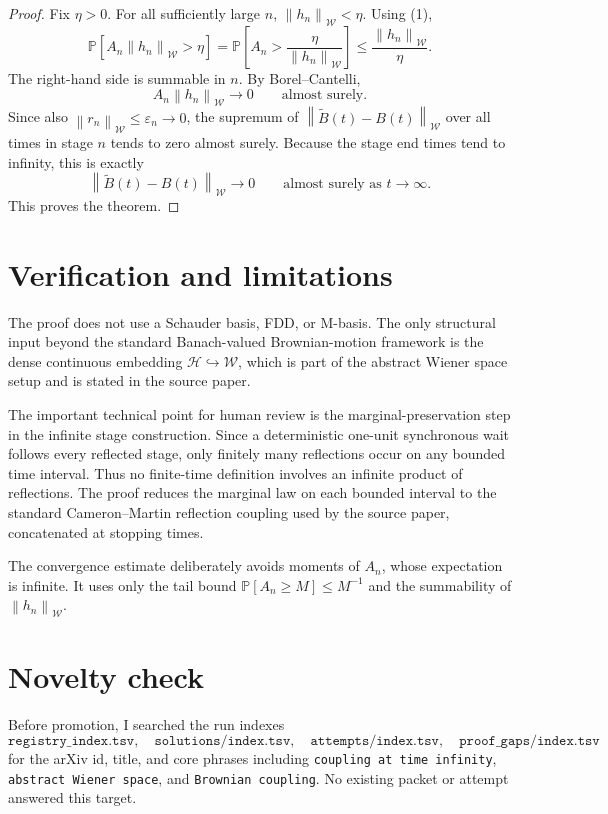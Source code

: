 \documentclass[11pt]{article}
\newcommand{\W}{\mathcal W}
\newcommand{\HH}{\mathcal H}
\newcommand{\norm}[1]{\left\lVert #1 \right\rVert}
\newcommand{\Prob}{\mathbb P}
\begin{document}
\begin{proof}
Fix \(\eta>0\).  For all sufficiently large \(n\), \(\norm{h_n}_{\W}<\eta\).
Using (1),
\[
        \Prob\!\left[
        A_n\norm{h_n}_{\W}>\eta
        \right]
        =
        \Prob\!\left[
        A_n>\frac{\eta}{\norm{h_n}_{\W}}
        \right]
        \le
        \frac{\norm{h_n}_{\W}}{\eta}.
\]
The right-hand side is summable in \(n\).  By Borel--Cantelli,
\[
        A_n\norm{h_n}_{\W}\longrightarrow0
        \qquad\text{almost surely.}
\]
Since also \(\norm{r_n}_{\W}\le\varepsilon_n\to0\), the supremum of
\(\norm{\widetilde B(t)-B(t)}_{\W}\) over all times in stage \(n\) tends to
zero almost surely.  Because the stage end times tend to infinity, this is
exactly
\[
        \norm{\widetilde B(t)-B(t)}_{\W}\to0
        \qquad\text{almost surely as }t\to\infty .
\]
This proves the theorem.
\end{proof}

\section{Verification and limitations}

The proof does not use a Schauder basis, FDD, or M-basis.  The only structural
input beyond the standard Banach-valued Brownian-motion framework is the
dense continuous embedding \(\HH\hookrightarrow\W\), which is part of the
abstract Wiener space setup and is stated in the source paper.

The important technical point for human review is the marginal-preservation
step in the infinite stage construction.  Since a deterministic one-unit
synchronous wait follows every reflected stage, only finitely many reflections
occur on any bounded time interval.  Thus no finite-time definition involves
an infinite product of reflections.  The proof reduces the marginal law on
each bounded interval to the standard Cameron--Martin reflection coupling
used by the source paper, concatenated at stopping times.

The convergence estimate deliberately avoids moments of \(A_n\), whose
expectation is infinite.  It uses only the tail bound
\(\Prob[A_n\ge M]\le M^{-1}\) and the summability of
\(\norm{h_n}_{\W}\).

\section{Novelty check}

Before promotion, I searched the run indexes
\[
\texttt{registry\_index.tsv},\quad
\texttt{solutions/index.tsv},\quad
\texttt{attempts/index.tsv},\quad
\texttt{proof\_gaps/index.tsv}
\]
for the arXiv id, title, and core phrases including
\texttt{coupling at time infinity}, \texttt{abstract Wiener space}, and
\texttt{Brownian coupling}.  No existing packet or attempt answered this
target.
\end{document}
